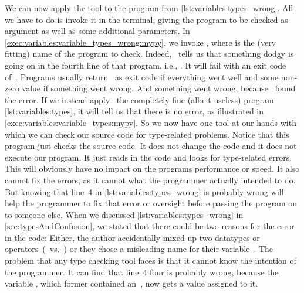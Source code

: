 We can now apply the tool to the program from \cref{lst:variables:types_wrong}.
All we have to do is invoke it in the terminal, giving the program to be checked as argument as well as some additional parameters.
In \cref{exec:variables:variable_types_wrong:mypy}, we invoke , where  is the (very fitting) name of the program to check.
Indeed, \mypy\ tells us that something dodgy is going on in the fourth line of that program, i.e., .
It will fail with an exit code of~.
Programs usually return~ as exit code if everything went well and some non-zero value if something went wrong.
And something went wrong, because \mypy\ found the error.%
%
%
%
If we instead apply \mypy\ the completely fine (albeit useless) program \cref{lst:variables:types}, it will tell us that there is no error, as illustrated in \cref{exec:variables:variable_types:mypy}.
So we now have one tool at our hands with which we can check our source code for type-related problems.
Notice that this program just checks the source code.
It does not change the code and it does not execute our program.
It just reads in the code and looks for type-related errors.
This will obviously have no impact on the programs performance or speed.
It also cannot fix the errors, as it cannot what the programmer actually intended to do.
But knowing that line~4 in \cref{lst:variables:types_wrong} is probably wrong will help the programmer to fix that error or oversight before passing the program on to someone else.%
%
%
%
\endhsection%
%
%
%
When we discussed \cref{lst:variables:types_wrong} in \cref{sec:typesAndConfusion}, we stated that there could be two reasons for the error in the code:
Either, the author accidentally mixed-up two datatypes or operators~(\pythonilIdx{/}~vs.~\pythonilIdx{//}) or they chose a misleading name for their variable~.
The problem that any type checking tool faces is that it cannot know the intention of the programmer.
It can find that line~4 four is probably wrong, because the variable , which former contained an~, now gets a  value assigned to it.

